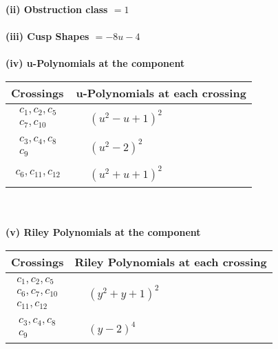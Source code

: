 \documentclass[1p]{elsarticle_modified}
\theoremstyle{definition}
\begin{document}
\flushleft \textbf{(ii) Obstruction class $= 1$}\\~\\
\flushleft \textbf{(iii) Cusp Shapes $= -8 u-4$}\\~\\
\newpage\renewcommand{\arraystretch}{1}
\flushleft \textbf{(iv) u-Polynomials at the component}\newline \\
\begin{tabular}{m{50pt}|m{274pt}}
Crossings & \hspace{64pt}u-Polynomials at each crossing \\
\hline $$\begin{aligned}c_{1},c_{2},c_{5}\\c_{7},c_{10}\end{aligned}$$&$\begin{aligned}
&(u^2- u+1)^2
\end{aligned}$\\
\hline $$\begin{aligned}c_{3},c_{4},c_{8}\\c_{9}\end{aligned}$$&$\begin{aligned}
&(u^2-2)^2
\end{aligned}$\\
\hline $$\begin{aligned}c_{6},c_{11},c_{12}\end{aligned}$$&$\begin{aligned}
&(u^2+u+1)^2
\end{aligned}$\\
\hline
\end{tabular}\\~\\
\newpage\renewcommand{\arraystretch}{1}
\flushleft \textbf{(v) Riley Polynomials at the component}\newline \\
\begin{tabular}{m{50pt}|m{274pt}}
Crossings & \hspace{64pt}Riley Polynomials at each crossing \\
\hline $$\begin{aligned}c_{1},c_{2},c_{5}\\c_{6},c_{7},c_{10}\\c_{11},c_{12}\end{aligned}$$&$\begin{aligned}
&(y^2+y+1)^2
\end{aligned}$\\
\hline $$\begin{aligned}c_{3},c_{4},c_{8}\\c_{9}\end{aligned}$$&$\begin{aligned}
&(y-2)^4
\end{aligned}$\\
\hline
\end{tabular}\\~\\
\end{document}
